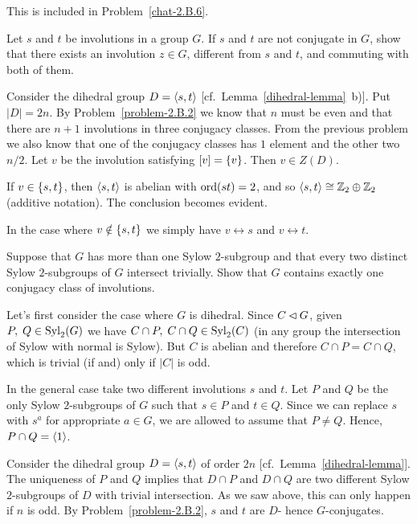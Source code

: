 \begin{solution} This is included in Problem~\ref{chat-2.B.6}.
\end{solution}

\begin{probl}
    Let\/ $s$ and\/ $t$ be involutions in a group\/ $G$. If\/ $s$ and\/ $t$ are not conjugate in\/ $G$, show that there exists an involution\/ $z\in G$, different from\/ $s$ and\/ $t$, and commuting with both of them.
\end{probl}

\begin{solution}
    Consider the dihedral group $D=\langle s,t\rangle$ [cf.~Lemma~\ref{dihedral-lemma}~b)]. Put $|D|=2n$. By Problem~\ref{problem-2.B.2} we know that $n$ must be even and that there are $n+1$ involutions in three conjugacy classes. From the previous problem we also know that one of the conjugacy classes has $1$ element and the other two $n/2$. Let $v$ be the involution satisfying $[v]=\{v\}$. Then $v\in Z(D)$.
    
    If $v\in\{s,t\}$, then $\langle s,t\rangle$ is abelian with ${\rm ord}(st)=2$, and so $\langle s,t\rangle\cong\mathbb{Z}_2\oplus\mathbb{Z}_2$ (additive notation). The conclusion becomes evident.
    
    In the case where $v\notin\{s,t\}$ we simply have $v\leftrightarrow s$ and $v\leftrightarrow t$.
\end{solution}

\begin{probl}
    Suppose that\/ $G$ has more than one Sylow\/ $2$-subgroup and that every two distinct Sylow\/ $2$-subgroups of\/ $G$ intersect trivially. Show that\/ $G$ contains exactly one conjugacy class of involutions.
\end{probl}

\begin{solution} Let's first consider the case where $G$ is dihedral. Since $C\lhd G$, given $P,\;Q\in{\rm Syl}_2(G)$ we have $C\cap P,\; C\cap Q\in{\rm Syl}_2(C)$ (in any group the intersection of Sylow with normal is Sylow). But $C$ is abelian and therefore $C\cap P=C\cap Q$, which is trivial (if and) only if $|C|$ is odd.

In the general case take two different involutions $s$ and $t$. Let $P$ and $Q$ be the only Sylow $2$-subgroups of $G$ such that $s\in P$ and $t\in Q$. Since we can replace $s$ with $s^a$ for appropriate $a\in G$, we are allowed to assume that $P\ne Q$. Hence, $P\cap Q=\langle1\rangle$. 

Consider the dihedral group $D=\langle s,t\rangle$ of order $2n$ [cf.~Lemma~\ref{dihedral-lemma}]. The uniqueness of $P$ and $Q$ implies that $D\cap P$ and $D\cap Q$ are two different Sylow $2$-subgroups of $D$ with trivial intersection. As we saw above, this can only happen if $n$ is odd. By Problem~\ref{problem-2.B.2}, $s$ and $t$ are $D$- hence $G$-conjugates.  \end{solution}

